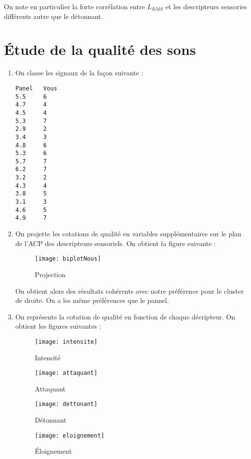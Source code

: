 \documentclass[12pt,a4paper,titlepage]{article}
\begin{document}
On note en particulier la forte corrélation entre $L_{RMS}$ et les descripteurs sensories différents autre que le détonnant.

\section{Étude de la qualité des sons}

\begin{enumerate}
    \item{On classe les signaux de la façon suivante :
        \begin{verbatim}
Panel	Vous
5.5	    6
4.7	    4
4.5	    4
5.3	    7
2.9	    2
3.4	    3
4.8	    6
5.3	    6
5.7	    7
6.2	    7
3.2	    2
4.3	    4
3.8	    5
3.1	    3
4.6	    5
4.9	    7
    \end{verbatim}
    }

    \item{On projette les cotations de qualité en variables supplémentaires sur le plan de l'ACP des descripteurs sensoriels.
        On obtient la figure suivante :

    \begin{figure}[H]
        \caption{Projection}
        \texttt{[image: biplotNous]}
        \centering
    \end{figure}

        On obtient alors des résultats cohérents avec notre préférence pour le cluster de droite. On a les même préférences que le pannel.
    }

\item{On représente la cotation de qualité en fonction de chaque décripteur. On obtient les figures suivantes :

    \begin{figure}[H]
        \caption{Intensité}
        \texttt{[image: intensite]}
        \centering
    \end{figure}

    \begin{figure}[H]
        \caption{Attaquant}
        \texttt{[image: attaquant]}
        \centering
    \end{figure}

    \begin{figure}[H]
        \caption{Détonnant}
        \texttt{[image: dettonant]}
        \centering
    \end{figure}

    \begin{figure}[H]
        \caption{Éloignement}
        \texttt{[image: eloignement]}
        \centering
    \end{figure}

}
\end{enumerate}
\end{document}
